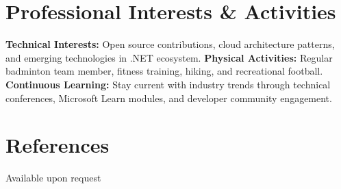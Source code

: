 \documentclass[paper=a4,fontsize=11pt]{article}
\newcommand{\NewPart}[1]{\section{#1}}
\begin{document}




\NewPart{Professional Interests \& Activities}
\noindent \textbf{Technical Interests:} Open source contributions, cloud architecture patterns, and emerging technologies in .NET ecosystem. \textbf{Physical Activities:} Regular badminton team member, fitness training, hiking, and recreational football. \textbf{Continuous Learning:} Stay current with industry trends through technical conferences, Microsoft Learn modules, and developer community engagement.


\NewPart{References}{}
Available upon request
\end{document}
